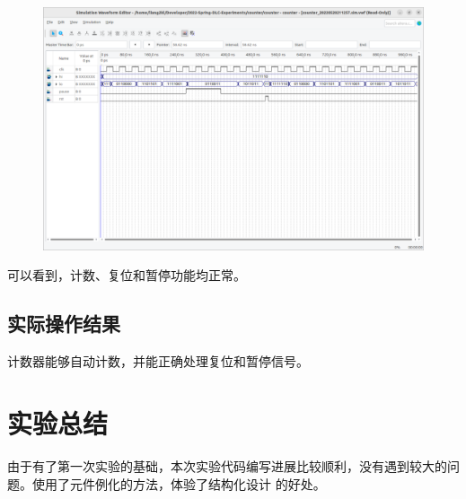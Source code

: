 \documentclass[a4paper]{article}
\begin{document}
\begin{figure}[H]
    \centering
    \includegraphics[width=1\textwidth]{./assets/simulation.png}
\end{figure}

可以看到，计数、复位和暂停功能均正常。

\subsection{实际操作结果}

计数器能够自动计数，并能正确处理复位和暂停信号。

\section{实验总结}

由于有了第一次实验的基础，本次实验代码编写进展比较顺利，没有遇到较大的问题。使用了元件例化的方法，体验了结构化设计
的好处。
\end{document}
